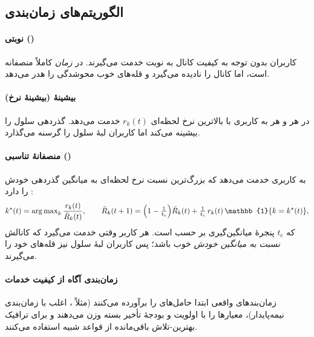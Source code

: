 \documentclass[11pt,a4paper]{article}
\begin{document}
\begin{acnfigure}
  \caption{هشت فرایند  در . یک  برای فرایند  چهار زیرقاب پس از ارسال
  می‌رسد؛ ارسال مجدد هشت زیرقاب پس از ارسال اصلی رخ می‌دهد.}
  \label{fig:harq}
\end{acnfigure}

\subsection{الگوریتم‌های زمان‌بندی}
\paragraph{نوبتی ()} کاربران بدون توجه به کیفیت کانال به نوبت خدمت می‌گیرند. در \emph{زمان} کاملاً
منصفانه است، اما کانال را نادیده می‌گیرد و قله‌های خوب محوشدگی را هدر می‌دهد.
\paragraph{بیشینهٔ  (بیشینهٔ نرخ)} در هر  و هر  به کاربری با بالاترین نرخ لحظه‌ای
$r_k(t)$ خدمت می‌دهد. گذردهی سلول را بیشینه می‌کند اما کاربران لبهٔ سلول را گرسنه می‌گذارد.
\paragraph{منصفانهٔ تناسبی ()} به کاربری خدمت می‌دهد که بزرگ‌ترین نسبت نرخ لحظه‌ای به میانگین گذردهی
خودش را دارد \cite{jalali2000hdr}:
\begin{equation}\label{eq:pfmetric}
  k^\ast(t) = \argmax_k \frac{r_k(t)}{\bar R_k(t)}, \qquad
  \bar R_k(t+1) = \Bigl(1-\tfrac{1}{t_\mathrm{c}}\Bigr)\bar R_k(t) + \tfrac{1}{t_\mathrm{c}}\,r_k(t)\,\mathbb{1}\{k = k^\ast(t)\},
\end{equation}
که $t_\mathrm{c}$ پنجرهٔ میانگین‌گیری بر حسب  است. هر کاربر وقتی خدمت می‌گیرد که کانالش \emph{نسبت به
میانگین خودش} خوب باشد؛ پس کاربران لبهٔ سلول نیز قله‌های خود را می‌گیرند.
\paragraph{زمان‌بندی آگاه از کیفیت خدمات} زمان‌بندهای واقعی ابتدا حامل‌های  را برآورده می‌کنند (مثلاً
، اغلب با زمان‌بندی نیمه‌پایدار)، معیارها را با اولویت  و بودجهٔ تأخیر بسته وزن می‌دهند و
برای ترافیک بهترین-تلاش باقی‌مانده از قواعد شبیه  استفاده می‌کنند.

\end{document}
